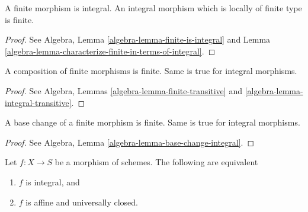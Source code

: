 \begin{lemma}
\label{lemma-finite-integral}
A finite morphism is integral.
An integral morphism which is locally of finite type is finite.
\end{lemma}

\begin{proof}
See Algebra, Lemma \ref{algebra-lemma-finite-is-integral}
and Lemma \ref{algebra-lemma-characterize-finite-in-terms-of-integral}.
\end{proof}

\begin{lemma}
\label{lemma-composition-finite}
A composition of finite morphisms is finite.
Same is true for integral morphisms.
\end{lemma}

\begin{proof}
See Algebra, Lemmas \ref{algebra-lemma-finite-transitive}
and \ref{algebra-lemma-integral-transitive}.
\end{proof}

\begin{lemma}
\label{lemma-base-change-finite}
A base change of a finite morphism is finite.
Same is true for integral morphisms.
\end{lemma}

\begin{proof}
See Algebra, Lemma \ref{algebra-lemma-base-change-integral}.
\end{proof}

\begin{lemma}
\label{lemma-integral-universally-closed}
Let $f : X \to S$ be a morphism of schemes.
The following are equivalent
\begin{enumerate}
\item $f$ is integral, and
\item $f$ is affine and universally closed.
\end{enumerate}
\end{lemma}

